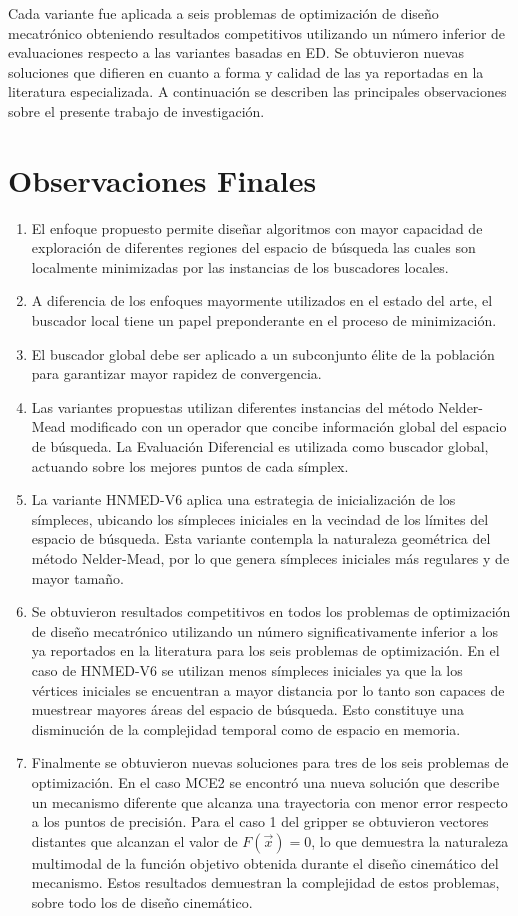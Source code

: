 Cada variante fue aplicada a seis problemas de optimización de diseño mecatrónico obteniendo resultados competitivos utilizando un número inferior de evaluaciones respecto a las variantes basadas en ED. Se obtuvieron nuevas soluciones que difieren en cuanto a forma y calidad de las ya reportadas en la literatura especializada. A continuación se describen las principales observaciones sobre el presente trabajo de investigación.
\section{Observaciones Finales}
\begin{enumerate}
	\item El enfoque propuesto permite diseñar algoritmos con mayor capacidad de exploración de diferentes regiones del espacio de búsqueda las cuales son localmente minimizadas por las instancias de los buscadores locales.
	\item A diferencia de los enfoques mayormente utilizados en el estado del arte, el buscador local tiene un papel preponderante en el proceso de minimización.
	\item El buscador global debe ser aplicado a un subconjunto élite de la población para garantizar mayor rapidez de convergencia.
	 \item Las variantes propuestas utilizan diferentes instancias del método Nelder-Mead modificado con un operador que concibe información global del espacio de búsqueda. La Evaluación Diferencial es utilizada como buscador global, actuando sobre los mejores puntos de cada símplex.
	 \item La variante HNMED-V6 aplica una estrategia de inicialización de los símpleces, ubicando los símpleces iniciales en la vecindad de los límites del espacio de búsqueda. Esta variante contempla la naturaleza geométrica del método Nelder-Mead, por lo que genera símpleces iniciales más regulares y de mayor tamaño. 
	 \item Se obtuvieron resultados competitivos en todos los problemas de optimización de diseño mecatrónico utilizando un número significativamente inferior a los ya reportados en la literatura para los seis problemas de optimización. En el caso de HNMED-V6 se utilizan menos símpleces iniciales ya que la los vértices iniciales se encuentran a mayor distancia por lo tanto son capaces de muestrear mayores áreas del espacio de búsqueda. Esto constituye una disminución de la complejidad temporal como de espacio en memoria.
	 \item Finalmente se obtuvieron nuevas soluciones para tres de los seis problemas de optimización. En el  caso MCE2 se encontró una nueva solución que describe un mecanismo diferente que alcanza una trayectoria con menor error respecto a los puntos de precisión. Para el caso 1 del gripper se obtuvieron vectores distantes que alcanzan el valor de $F(\vec{x})=0$, lo que demuestra la naturaleza multimodal de la función objetivo obtenida durante el diseño cinemático del mecanismo. Estos resultados demuestran la complejidad de estos problemas, sobre todo los de diseño cinemático. 
\end{enumerate}  
	 
